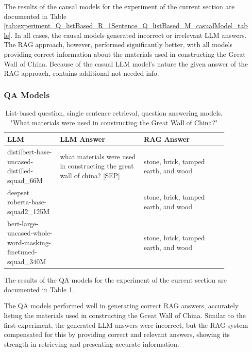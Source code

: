 \documentclass{wseas}
\begin{document}
The results of the causal models for the experiment of the current section 
are documented in Table \ref{tab:experiment_Q_listBased_R_1Sentence_Q_listBased_M_casualModel_table}.
In all cases, the causal models generated incorrect or irrelevant LLM
answers. The RAG approach, however, performed significantly better, with
all models providing correct information about the materials used in
constructing the Great Wall of China. Because of the casual LLM model's nature the given answer
of the RAG approach, contains additional not needed info.

\subsubsection{QA Models}


\begin{table}[htbp]
  \centering
  \caption{List-based question, single sentence retrieval, question answering models. "What materials were used in constructing the Great Wall of China?"} %
  \label{tab:experiment_Q_listBased_R_1Sentence_Q_listBased_M_QaModels_table} 
  \begin{tabular}{|p{0.20\linewidth}|p{0.35\linewidth}|p{0.35\linewidth}|}
    \hline
    \textbf{LLM} & \textbf{LLM Answer} & \textbf{RAG Answer} \\ \hline
    distilbert-base-uncased-distilled-squad\_66M & what materials were used in constructing the great wall of china? {[}SEP{]} & stone, brick, tamped earth, and wood \\ \hline
    deepset roberta-base-squad2\_125M & & stone, brick, tamped earth, and wood \\ \hline
    bert-large-uncased-whole-word-masking-finetuned-squad\_340M & & stone, brick, tamped earth, and wood \\ \hline
  \end{tabular}
\end{table}


The results of the QA models for the experiment of the current section 
are documented in Table \ref{tab:experiment_Q_listBased_R_1Sentence_Q_listBased_M_QaModels_table}.

The QA models performed well in generating correct RAG answers,
accurately listing the materials used in constructing the Great Wall of
China. Similar to the first experiment, the generated LLM answers were
incorrect, but the RAG system compensated for this by providing correct
and relevant answers, showing its strength in retrieving and presenting
accurate information.
\end{document}
